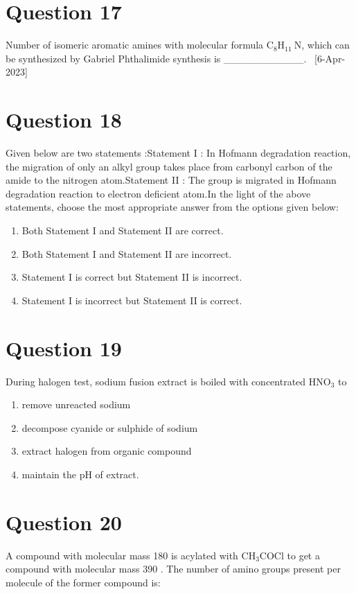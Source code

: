 \documentclass{article}
\begin{document}
\section*{Question 17}
Number of isomeric aromatic amines with molecular formula \(\mathrm{C}_8 \mathrm{H}_{11} \mathrm{~N}\), which can be synthesized by Gabriel Phthalimide synthesis is ___________.  [6-Apr-2023]
\begin{enumerate}[label=(\alph*)]
\end{enumerate}
\newpage
\section*{Question 18}
Given below are two statements :Statement I : In Hofmann degradation reaction, the migration of only an alkyl group takes place from carbonyl carbon of the amide to the nitrogen atom.Statement II : The group is migrated in Hofmann degradation reaction to electron deficient atom.In the light of the above statements, choose the most appropriate answer from the options given below: 
\begin{enumerate}[label=(\alph*)]
\item Both Statement I and Statement II are correct.
\item Both Statement I and Statement II are incorrect.
\item Statement I is correct but Statement II is incorrect.
\item Statement I is incorrect but Statement II is correct.
\end{enumerate}
\newpage
\section*{Question 19}
During halogen test, sodium fusion extract is boiled with concentrated \(\mathrm{HNO}_3\) to 
\begin{enumerate}[label=(\alph*)]
\item remove unreacted sodium
\item decompose cyanide or sulphide of sodium
\item extract halogen from organic compound
\item maintain the \(\mathrm{pH}\) of extract.
\end{enumerate}
\newpage
\section*{Question 20}
A compound with molecular mass 180 is acylated with \(\mathrm{CH}_3 \mathrm{COCl}\) to get a compound with molecular mass 390 . The number of amino groups present per molecule of the former compound is: 
\begin{enumerate}[label=(\alph*)]
\end{enumerate}
\newpage
\end{document}
